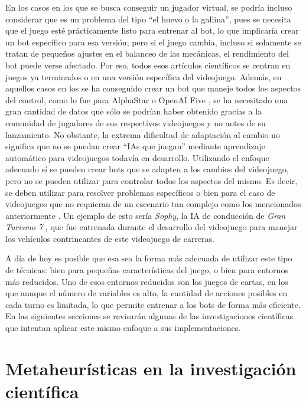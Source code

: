 En los casos en los que se busca conseguir un jugador virtual, se podría incluso considerar que es un problema del tipo ``el huevo o la gallina'', pues se necesita que el juego esté prácticamente listo para entrenar al bot, lo que implicaría crear un bot específico para esa versión; pero si el juego cambia, incluso si solamente se tratan de pequeños ajustes en el balanceo de las mecánicas, el rendimiento del bot puede verse afectado. Por eso, todos esos artículos científicos se centran en juegos ya terminados o en una versión específica del videojuego. Además, en aquellos casos en los se ha conseguido crear un bot que maneje todos los aspectos del control, como lo fue para AlphaStar \cite{vinyals_grandmaster_2019} o OpenAI Five \cite{openai_dota_2019}, se ha necesitado una gran cantidad de datos que sólo se podrían haber obtenido gracias a la comunidad de jugadores de sus respectivos videojuegos y no antes de su lanzamiento. No obstante, la extrema dificultad de adaptación al cambio no significa que no se puedan crear ``IAs que juegan'' mediante aprendizaje automático para videojuegos todavía en desarrollo. Utilizando el enfoque adecuado sí se pueden crear bots que se adapten a los cambios del videojuego, pero no se pueden utilizar para controlar todos los aspectos del mismo. Es decir, se deben utilizar para resolver problemas específicos o bien para el caso de videojuegos que no requieran de un escenario tan complejo como los mencionados anteriormente \cite{ai_and_games_why_2024}. Un ejemplo de esto sería \textit{Sophy}, la IA de conducción de \textit{Gran Turismo 7} \cite{wurman_outracing_2022}, que fue entrenada durante el desarrollo del videojuego para manejar los vehículos contrincantes de este videojuego de carreras.

A día de hoy es posible que esa sea la forma más adecuada de utilizar este tipo de técnicas: bien para pequeñas características del juego, o bien para entornos más reducidos. Uno de esos entornos reducidos son los juegos de cartas, en los que aunque el número de variables es alto, la cantidad de acciones posibles en cada turno es limitada, lo que permite entrenar a los bots de forma más eficiente. En las siguientes secciones se revisarán algunas de las investigaciones científicas que intentan aplicar este mismo enfoque a sus implementaciones.

\section{Metaheurísticas en la investigación científica} \label{sec:estado_arte}


